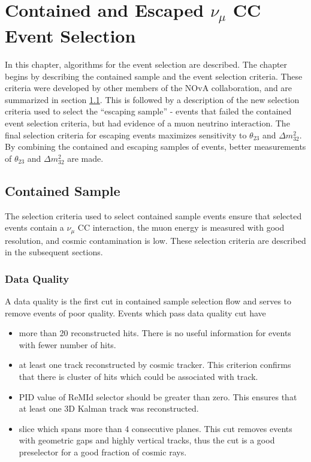\chapter{Contained and Escaped $\nu_\mu$ CC Event Selection}
\label{event_selection_chapter}

In this chapter, algorithms for the event selection are
described. The chapter begins by describing the contained sample and the event selection
criteria. These criteria were developed by other members of the NOvA collaboration,
and are summarized in section \ref{cont_sec}.  This is followed by a description of
the new selection criteria used to select the ``escaping sample'' - events that failed
the contained event selection criteria, but had evidence of a muon neutrino interaction. The
final selection criteria for escaping events maximizes sensitivity to
$\theta_{23}$ and $\Delta m_{32}^2$. By combining the contained and escaping samples of 
events, better measurements of $\theta_{23}$ and $\Delta m_{32}^2$ are made.

\section{Contained Sample} \label{cont_sec}
The selection criteria used to select contained sample events ensure that selected events
contain a $\nu_\mu$ CC interaction, the muon energy is measured with good resolution,
and cosmic contamination is low.  These selection criteria are described in the subsequent
sections.

\subsection{Data Quality}
A data quality is the first cut in contained sample selection flow and serves to remove 
events of poor quality. Events which pass data quality cut have
\begin{itemize}
\item more than 20 reconstructed hits. There is no useful information for events with fewer 
number of hits.
\item at least one track reconstructed by cosmic tracker. This criterion confirms that there is
cluster of hits which could be associated with track.
\item PID value of ReMId selector should be greater than zero. This ensures that at least one 
3D Kalman track was reconstructed.
\item slice which spans more than 4 consecutive planes. This cut removes events with geometric 
gaps and highly vertical tracks, thus the cut is a good preselector for a good fraction of 
cosmic rays.
\end{itemize}

